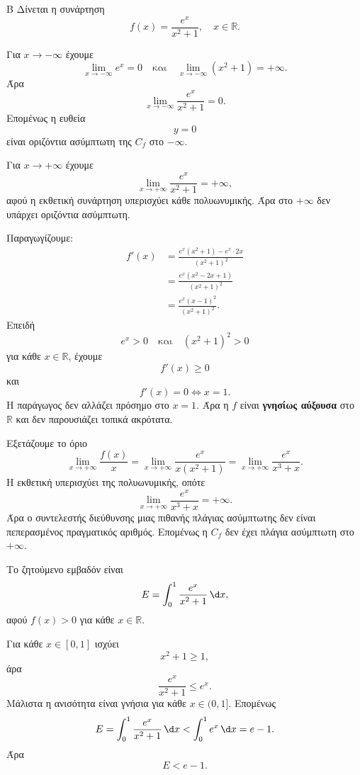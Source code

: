 \begin{thema}{Β}
Δίνεται η συνάρτηση
\[
f(x)=\frac{e^x}{x^2+1},\quad x\in\mathbb{R}.
\]
\begin{erwthma}
\item Για $x\to-\infty$ έχουμε
\[
\lim_{x\to-\infty}e^x=0
\quad\text{και}\quad
\lim_{x\to-\infty}(x^2+1)=+\infty.
\]
Άρα
\[
\lim_{x\to-\infty}\frac{e^x}{x^2+1}=0.
\]
Επομένως η ευθεία
\[
{y=0}
\]
είναι οριζόντια ασύμπτωτη της $C_f$ στο $-\infty$.

Για $x\to+\infty$ έχουμε
\[
\lim_{x\to+\infty}\frac{e^x}{x^2+1}=+\infty,
\]
αφού η εκθετική συνάρτηση υπερισχύει κάθε πολυωνυμικής. Άρα στο $+\infty$ δεν υπάρχει οριζόντια ασύμπτωτη.

\item Παραγωγίζουμε:
\begin{align*}
f'(x)
&=\frac{e^x(x^2+1)-e^x\cdot2x}{(x^2+1)^2}\\
&=\frac{e^x(x^2-2x+1)}{(x^2+1)^2}\\
&=\frac{e^x(x-1)^2}{(x^2+1)^2}.
\end{align*}
Επειδή
\[
e^x>0
\quad\text{και}\quad
(x^2+1)^2>0
\]
για κάθε $x\in\mathbb{R}$, έχουμε
\[
f'(x)\geq0
\]
και
\[
f'(x)=0\Leftrightarrow x=1.
\]
Η παράγωγος δεν αλλάζει πρόσημο στο $x=1$. Άρα η $f$ είναι \textbf{γνησίως αύξουσα} στο $\mathbb{R}$ και δεν παρουσιάζει τοπικά ακρότατα.

\item Εξετάζουμε το όριο
\[
\lim_{x\to+\infty}\frac{f(x)}{x}
=\lim_{x\to+\infty}\frac{e^x}{x(x^2+1)}
=\lim_{x\to+\infty}\frac{e^x}{x^3+x}.
\]
Η εκθετική υπερισχύει της πολυωνυμικής, οπότε
\[
\lim_{x\to+\infty}\frac{e^x}{x^3+x}=+\infty.
\]
Άρα ο συντελεστής διεύθυνσης μιας πιθανής πλάγιας ασύμπτωτης δεν είναι πεπερασμένος πραγματικός αριθμός. Επομένως η $C_f$ δεν έχει πλάγια ασύμπτωτη στο $+\infty$.

\item Το ζητούμενο εμβαδόν είναι
\[
E=\dint_0^1 \frac{e^x}{x^2+1}\,\d x,
\]
αφού $f(x)>0$ για κάθε $x\in\mathbb{R}$.

Για κάθε $x\in[0,1]$ ισχύει
\[
x^2+1\geq1,
\]
άρα
\[
\frac{e^x}{x^2+1}\leq e^x.
\]
Μάλιστα η ανισότητα είναι γνήσια για κάθε $x\in(0,1]$. Επομένως
\[
E=\dint_0^1 \frac{e^x}{x^2+1}\,\d x
<
\dint_0^1 e^x\,\d x
=e-1.
\]
Άρα
\[
{E<e-1}.
\]
\end{erwthma}
\end{thema}

